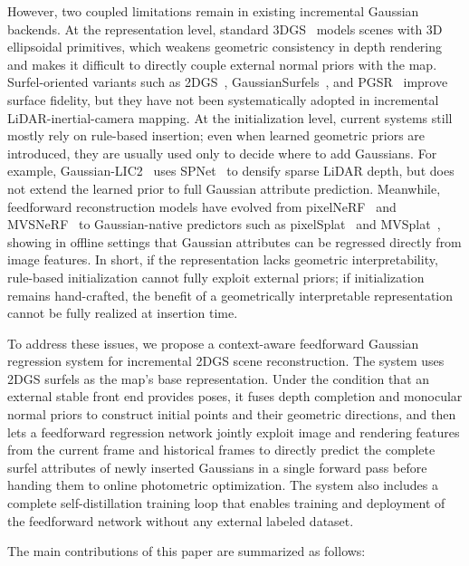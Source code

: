 \documentclass[lettersize,journal]{IEEEtran}
\begin{document}
However, two coupled limitations remain in existing incremental Gaussian backends. At the representation level, standard 3DGS~\cite{kerbl20233d} models scenes with 3D ellipsoidal primitives, which weakens geometric consistency in depth rendering and makes it difficult to directly couple external normal priors with the map. Surfel-oriented variants such as 2DGS~\cite{huang20242d}, GaussianSurfels~\cite{dai2024high}, and PGSR~\cite{chen2024pgsr} improve surface fidelity, but they have not been systematically adopted in incremental LiDAR-inertial-camera mapping. At the initialization level, current systems still mostly rely on rule-based insertion; even when learned geometric priors are introduced, they are usually used only to decide where to add Gaussians. For example, Gaussian-LIC2~\cite{lang2025gaussianlic2} uses SPNet~\cite{wang2024scale} to densify sparse LiDAR depth, but does not extend the learned prior to full Gaussian attribute prediction. Meanwhile, feedforward reconstruction models have evolved from pixelNeRF~\cite{yu2021pixelnerf} and MVSNeRF~\cite{chen2021mvsnerf} to Gaussian-native predictors such as pixelSplat~\cite{charatan2024pixelsplat} and MVSplat~\cite{chen2024mvsplat}, showing in offline settings that Gaussian attributes can be regressed directly from image features. In short, if the representation lacks geometric interpretability, rule-based initialization cannot fully exploit external priors; if initialization remains hand-crafted, the benefit of a geometrically interpretable representation cannot be fully realized at insertion time.

To address these issues, we propose a context-aware feedforward Gaussian regression system for incremental 2DGS scene reconstruction. The system uses 2DGS surfels as the map's base representation. Under the condition that an external stable front end provides poses, it fuses depth completion and monocular normal priors to construct initial points and their geometric directions, and then lets a feedforward regression network jointly exploit image and rendering features from the current frame and historical frames to directly predict the complete surfel attributes of newly inserted Gaussians in a single forward pass before handing them to online photometric optimization. The system also includes a complete self-distillation training loop that enables training and deployment of the feedforward network without any external labeled dataset.

The main contributions of this paper are summarized as follows:
\end{document}
